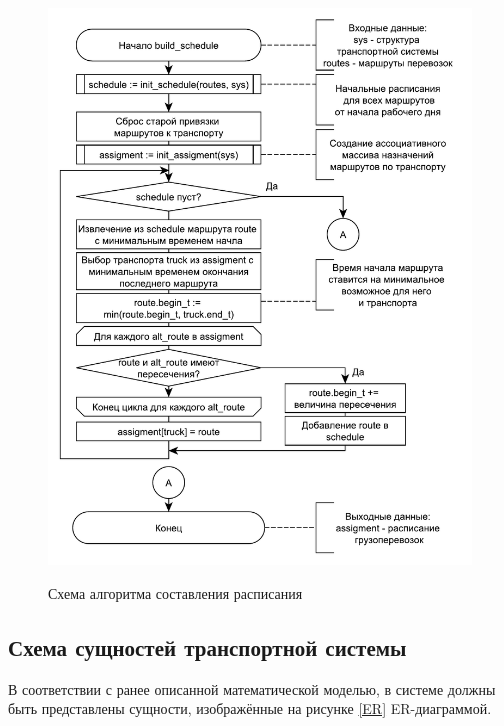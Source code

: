 \begin{figure}[hp]
	\begin{center}
		{\includegraphics[scale=0.7, angle=0, page=1]{img/schedule.pdf}}
		\caption{Схема алгоритма составления расписания}
		\label{alg:schedule}
	\end{center}
\end{figure}

\subsection{Схема сущностей транспортной системы}
В соответствии с ранее описанной математической моделью, в системе должны быть представлены сущности, изображённые на рисунке \ref{ER} ER-диаграммой.

